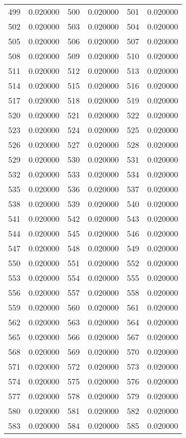 \documentclass[12pt]{article}
\begin{document}
\begin{longtable}{@{}cc|cc|cc@{}}
499 & 0.020000 & 500 & 0.020000 & 501 & 0.020000 \\
502 & 0.020000 & 503 & 0.020000 & 504 & 0.020000 \\
505 & 0.020000 & 506 & 0.020000 & 507 & 0.020000 \\
508 & 0.020000 & 509 & 0.020000 & 510 & 0.020000 \\
511 & 0.020000 & 512 & 0.020000 & 513 & 0.020000 \\
514 & 0.020000 & 515 & 0.020000 & 516 & 0.020000 \\
517 & 0.020000 & 518 & 0.020000 & 519 & 0.020000 \\
520 & 0.020000 & 521 & 0.020000 & 522 & 0.020000 \\
523 & 0.020000 & 524 & 0.020000 & 525 & 0.020000 \\
526 & 0.020000 & 527 & 0.020000 & 528 & 0.020000 \\
529 & 0.020000 & 530 & 0.020000 & 531 & 0.020000 \\
532 & 0.020000 & 533 & 0.020000 & 534 & 0.020000 \\
535 & 0.020000 & 536 & 0.020000 & 537 & 0.020000 \\
538 & 0.020000 & 539 & 0.020000 & 540 & 0.020000 \\
541 & 0.020000 & 542 & 0.020000 & 543 & 0.020000 \\
544 & 0.020000 & 545 & 0.020000 & 546 & 0.020000 \\
547 & 0.020000 & 548 & 0.020000 & 549 & 0.020000 \\
550 & 0.020000 & 551 & 0.020000 & 552 & 0.020000 \\
553 & 0.020000 & 554 & 0.020000 & 555 & 0.020000 \\
556 & 0.020000 & 557 & 0.020000 & 558 & 0.020000 \\
559 & 0.020000 & 560 & 0.020000 & 561 & 0.020000 \\
562 & 0.020000 & 563 & 0.020000 & 564 & 0.020000 \\
565 & 0.020000 & 566 & 0.020000 & 567 & 0.020000 \\
568 & 0.020000 & 569 & 0.020000 & 570 & 0.020000 \\
571 & 0.020000 & 572 & 0.020000 & 573 & 0.020000 \\
574 & 0.020000 & 575 & 0.020000 & 576 & 0.020000 \\
577 & 0.020000 & 578 & 0.020000 & 579 & 0.020000 \\
580 & 0.020000 & 581 & 0.020000 & 582 & 0.020000 \\
583 & 0.020000 & 584 & 0.020000 & 585 & 0.020000 \\

\end{longtable}
\end{document}
